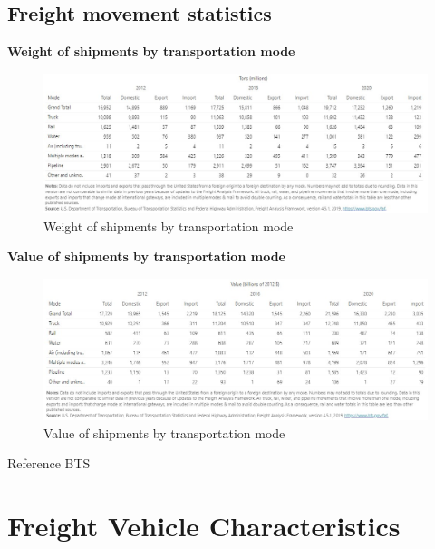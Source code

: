\documentclass[
]{book}
\begin{document}
\hypertarget{intro-statistics}{%
\section{Freight movement statistics}\label{intro-statistics}}

\textbf{Weight of shipments by transportation mode}

\begin{figure}

{\centering \includegraphics{./Images/FreightShipments_Weight} 

}

\caption{Weight of shipments by transportation mode}\label{fig:FreightByWeightImage}
\end{figure}

\textbf{Value of shipments by transportation mode}

\begin{figure}

{\centering \includegraphics{./Images/FreightShipments_Value} 

}

\caption{Value of shipments by transportation mode}\label{fig:FreightByValueImage}
\end{figure}

Reference BTS

\hypertarget{VehChars}{%
\chapter{Freight Vehicle Characteristics}\label{VehChars}}
\end{document}

